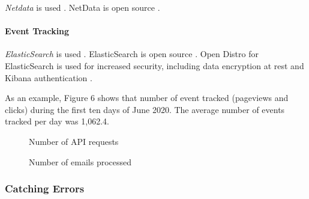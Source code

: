 \documentclass{article}
\begin{document}
\emph{Netdata} is used \cite{noauthor_netdata_nodate}. NetData is open source \cite{noauthor_netdata/netdata_2020}.

\paragraph{Event Tracking}

\emph{ElasticSearch} is used \cite{noauthor_elastic_nodate}. ElasticSearch is open source \cite{noauthor_elastic/elasticsearch_2020}. Open Distro for ElasticSearch is used for increased security, including data encryption at rest and Kibana authentication \cite{noauthor_open_nodate}.

As an example, Figure 6 shows that number of event tracked (pageviews and clicks) during the first ten days of June 2020. The average number of events tracked per day was 1,062.4.

\begin{figure}
	\centering
	\begin{minipage}{.47\textwidth}
		\caption{Number of API requests}
	\end{minipage}%
	\hspace{.5cm}
	\begin{minipage}{.47\textwidth}
		\caption{Number of emails processed}
	\end{minipage}
\end{figure}

\subsubsection{Catching Errors}
\end{document}
